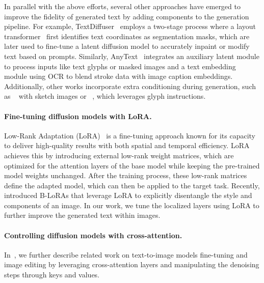 In parallel with the above efforts, several other approaches have emerged to improve the fidelity of generated text by adding components to the generation pipeline. For example, TextDiffuser~\cite{textdiffuser} employs a two-stage process where a layout transformer~\citep{gupta2021layouttransformer} first identifies text coordinates as segmentation masks, which are later used to fine-tune a latent diffusion model to accurately inpaint or modify text based on prompts. Similarly, AnyText~\citep{tuo2024anytext} integrates an auxiliary latent module to process inputs like text glyphs or masked images and a text embedding module using OCR to blend stroke data with image caption embeddings. Additionally, other works incorporate extra conditioning during generation, such as ~\citet{zhang2024brush} with sketch images or ~\citet{yang2024glyphcontrol}, which leverages glyph instructions.















\paragraph{Fine-tuning diffusion models with LoRA.}
Low-Rank Adaptation (LoRA)~\citep{hu2022lora} is a fine-tuning approach known for its capacity to deliver high-quality results with both spatial and temporal efficiency. LoRA achieves this by introducing external low-rank weight matrices, which are optimized for the attention layers of the base model while keeping the pre-trained model weights unchanged. After the training process, these low-rank matrices define the adapted model, which can then be applied to the target task. Recently, \citep{frenkel2024implicit} introduced B-LoRAs that leverage LoRA to explicitly disentangle the style and components of an image. In our work, we tune the localized layers using LoRA to further improve the generated text within images.

\paragraph{Controlling diffusion models with cross-attention.} In~, we further describe related work on text-to-image models fine-tuning and image editing by leveraging cross-attention layers and manipulating the denoising steps through keys and values.











